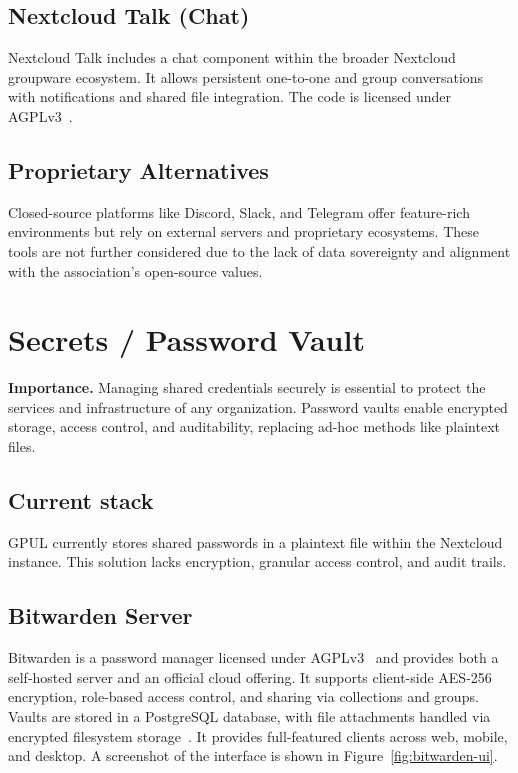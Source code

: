 \subsection{Nextcloud Talk (Chat)}

Nextcloud Talk includes a chat component within the broader Nextcloud groupware ecosystem. It allows persistent one-to-one and group conversations with notifications and shared file integration. The code is licensed under AGPLv3~\cite{nextcloud-talk-docs}.

\subsection{Proprietary Alternatives}

Closed-source platforms like Discord, Slack, and Telegram offer feature-rich environments but rely on external servers and proprietary ecosystems. These tools are not further considered due to the lack of data sovereignty and alignment with the association's open-source values.

\section{Secrets / Password Vault}

\textbf{Importance.} Managing shared credentials securely is essential to protect the services and infrastructure of any organization. Password vaults enable encrypted storage, access control, and auditability, replacing ad-hoc methods like plaintext files.

\subsection{Current stack}
GPUL currently stores shared passwords in a plaintext file within the Nextcloud instance. This solution lacks encryption, granular access control, and audit trails.

\subsection{Bitwarden Server}
Bitwarden is a password manager licensed under AGPLv3~\cite{bitwarden-license} and provides both a self-hosted server and an official cloud offering. It supports client-side AES-256 encryption, role-based access control, and sharing via collections and groups. Vaults are stored in a PostgreSQL database, with file attachments handled via encrypted filesystem storage~\cite{bitwarden-groups}. It provides full-featured clients across web, mobile, and desktop. A screenshot of the interface is shown in Figure~\ref{fig:bitwarden-ui}.

